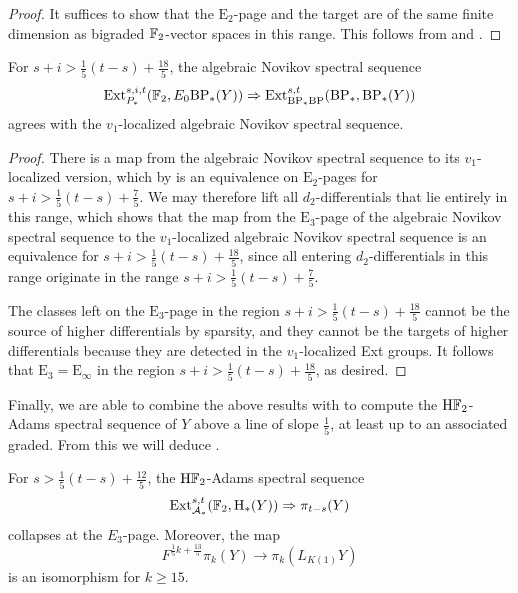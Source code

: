 \begin{proof}
    It suffices to show that the $\mathrm{E}_2$-page and the target are of the same finite dimension as bigraded $\operatorname{\mathbb{F}}_2$-vector spaces in this range. This follows from  and .
\end{proof}

\begin{cor}\label{cor:alg-nov-range}
    For $s + i > \frac{1}{5} (t-s) + \frac{18}{5}$, the algebraic Novikov spectral sequence \[\operatorname{\mathrm{Ext}}^{s,i,t} _{P_*} (\operatorname{\mathbb{F}}_2, E_0 \mathrm{BP}_* (Y)) \Rightarrow \operatorname{\mathrm{Ext}}^{s,t} _{\mathrm{BP}_* \mathrm{BP}} (\mathrm{BP}_*, \mathrm{BP}_*(Y))\] agrees with the $v_1$-localized algebraic Novikov spectral sequence.
\end{cor}

\begin{proof}
    There is a map from the algebraic Novikov spectral sequence to its $v_1$-localized version, which by  is an equivalence on $\mathrm{E}_2$-pages for $s+i > \frac{1}{5} (t-s) + \frac{7}{5}$. We may therefore lift all $d_2$-differentials that lie entirely in this range, which shows that the map from the $\mathrm{E}_3$-page of the algebraic Novikov spectral sequence to the $v_1$-localized algebraic Novikov spectral sequence is an equivalence for $s+i > \frac{1}{5}(t-s)+\frac{18}{5}$, since all entering $d_2$-differentials in this range originate in the range $s+i > \frac{1}{5} (t-s) + \frac{7}{5}$.

    The classes left on the $\mathrm{E}_3$-page in the region $s+i > \frac{1}{5}(t-s) + \frac{18}{5}$ cannot be the source of higher differentials by sparsity, and they cannot be the targets of higher differentials because they are detected in the $v_1$-localized Ext groups. It follows that $\mathrm{E}_3 = \mathrm{E}_\infty$ in the region $s+i > \frac{1}{5} (t-s) + \frac{18}{5}$, as desired.
\end{proof}

Finally, we are able to combine the above results with  to compute the $\mathrm{H}\mathbb{F}_2$-Adams spectral sequence of $Y$ above a line of slope $\frac{1}{5}$, at least up to an associated graded. From this we will deduce .

\begin{prop}\label{prop:Y-main-prop}
    For $s > \frac{1}{5}(t-s) + \frac{12}{5}$, the $\mathrm{H}\mathbb{F}_2$-Adams spectral sequence \[\operatorname{\mathrm{Ext}}^{s,t} _{\operatorname{\mathcal{A}}_*} (\operatorname{\mathbb{F}}_2, \mathrm{H}_* (Y)) \Rightarrow \pi_{t-s} (Y)\] collapses at the $E_3$-page. Moreover, the map \[ F^{\frac{1}{5}k + \frac{13}{5}} \pi_k (Y) \to \pi_k (L_{K(1)} Y) \] is an isomorphism for $k \geq 15$.
\end{prop}

